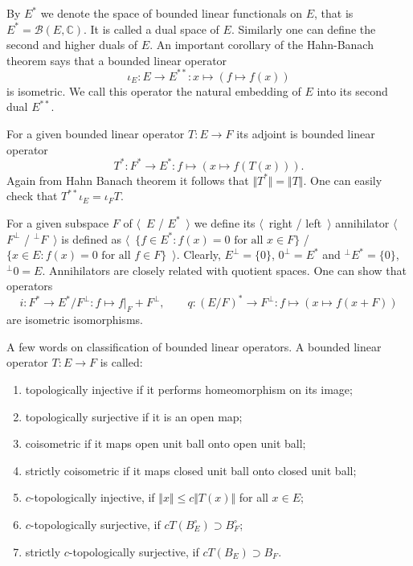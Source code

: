 By $E^*$ we denote the space of bounded linear functionals on $E$, that is
$E^*=\mathcal{B}(E, \mathbb{C})$. It is called a dual space of $E$. Similarly
one can define the second and higher duals of $E$. An important corollary of the
Hahn-Banach theorem says that a bounded linear operator 
$$
\iota_E:E\to E^{**}:x\mapsto (f\mapsto f(x))
$$ 
is isometric. We call this operator the natural embedding of $E$ into its 
second dual $E^{**}$.

For a given bounded linear operator $T:E\to F$ its adjoint is bounded linear 
operator 
$$
T^*:F^*\to E^*:f\mapsto (x\mapsto f(T(x))).
$$
Again from Hahn Banach 
theorem it follows that $\Vert T^*\Vert=\Vert T\Vert$. One can easily check 
that $T^{**}\iota_E=\iota_F T$.  

For a given subspace $F$ of $\langle$~$E$ / $E^*$~$\rangle$ we define 
its $\langle$~right / left~$\rangle$ annihilator 
$\langle$~$F^\perp$ / ${}^\perp F$~$\rangle$ is defined as 
$\langle$~$ \{ f\in E^*: f(x)=0 \mbox{ for all } x\in F \}$ / 
$ \{ x\in E : f(x)=0 \mbox{ for all } f\in F \}$~$\rangle$. 
Clearly, $E^{\perp} = \{ 0\}$, $0^{\perp}=E^*$ 
and ${}^{\perp}E^*= \{ 0\}$, ${}^{\perp}0= E$. Annihilators are closely related
with quotient spaces. One can show that 
operators 
$$
i: F^*\to E^*/F^{\perp}: f\mapsto f|_F+F^\perp,
\quad\quad 
q:{(E/F)}^*\to F^{\perp}: f\mapsto (x\mapsto f(x + F))
$$ 
are isometric isomorphisms.

A few words on classification of bounded linear operators. A bounded linear
operator $T:E\to F$ is called:
\begin{enumerate}[label = (\roman*)]
  \item topologically injective if it performs homeomorphism on its image;

  \item topologically surjective if it is an open map;

  \item coisometric if it maps open unit ball onto open unit ball;

  \item strictly coisometric if it maps closed unit ball onto closed unit ball; 

  \item $c$-topologically injective, if $\Vert x\Vert\leq c\Vert  T(x)\Vert$ for
  all $x\in E$;

  \item $c$-topologically surjective, if $cT(B_E^\circ)\supset B_F^\circ$;

  \item strictly $c$-topologically surjective, if $cT(B_E)\supset B_F$.
\end{enumerate}

